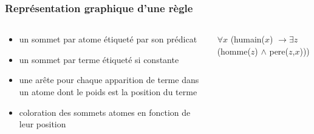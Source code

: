 \begin{frame}
	\frametitle{Représentation graphique d'une règle}

	\begin{columns}
	
	\begin{column}{0.45\linewidth}
		\begin{itemize}
			\item un sommet par atome étiqueté par son prédicat \checkmark
			\item un sommet par terme étiqueté si constante \checkmark
			\item une arête pour chaque apparition de terme dans un atome 
			dont le poids est la position du terme \checkmark
			\item coloration des sommets atomes en fonction de leur position
		\end{itemize}
	\end{column}
	\vline
	\hfill
	\begin{column}{0.45\linewidth}
		$\forall x$ (humain($x$) $\rightarrow \exists z$ (homme($z$) $\wedge$
		pere($z$,$x$)))
		\begin{figure}
		\end{figure}
	\end{column}
	\end{columns}
\end{frame}

